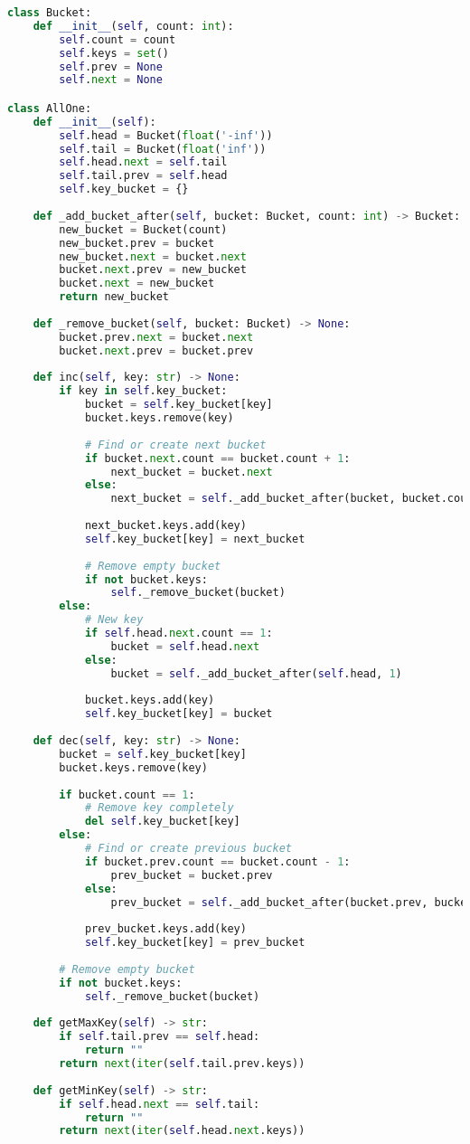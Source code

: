 \documentclass[10pt, a4paper]{article}
\begin{document}
\begin{lstlisting}[language=Python]
class Bucket:
    def __init__(self, count: int):
        self.count = count
        self.keys = set()
        self.prev = None
        self.next = None

class AllOne:
    def __init__(self):
        self.head = Bucket(float('-inf'))
        self.tail = Bucket(float('inf'))
        self.head.next = self.tail
        self.tail.prev = self.head
        self.key_bucket = {}
    
    def _add_bucket_after(self, bucket: Bucket, count: int) -> Bucket:
        new_bucket = Bucket(count)
        new_bucket.prev = bucket
        new_bucket.next = bucket.next
        bucket.next.prev = new_bucket
        bucket.next = new_bucket
        return new_bucket
    
    def _remove_bucket(self, bucket: Bucket) -> None:
        bucket.prev.next = bucket.next
        bucket.next.prev = bucket.prev
    
    def inc(self, key: str) -> None:
        if key in self.key_bucket:
            bucket = self.key_bucket[key]
            bucket.keys.remove(key)
            
            # Find or create next bucket
            if bucket.next.count == bucket.count + 1:
                next_bucket = bucket.next
            else:
                next_bucket = self._add_bucket_after(bucket, bucket.count + 1)
            
            next_bucket.keys.add(key)
            self.key_bucket[key] = next_bucket
            
            # Remove empty bucket
            if not bucket.keys:
                self._remove_bucket(bucket)
        else:
            # New key
            if self.head.next.count == 1:
                bucket = self.head.next
            else:
                bucket = self._add_bucket_after(self.head, 1)
            
            bucket.keys.add(key)
            self.key_bucket[key] = bucket
    
    def dec(self, key: str) -> None:
        bucket = self.key_bucket[key]
        bucket.keys.remove(key)
        
        if bucket.count == 1:
            # Remove key completely
            del self.key_bucket[key]
        else:
            # Find or create previous bucket
            if bucket.prev.count == bucket.count - 1:
                prev_bucket = bucket.prev
            else:
                prev_bucket = self._add_bucket_after(bucket.prev, bucket.count - 1)
            
            prev_bucket.keys.add(key)
            self.key_bucket[key] = prev_bucket
        
        # Remove empty bucket
        if not bucket.keys:
            self._remove_bucket(bucket)
    
    def getMaxKey(self) -> str:
        if self.tail.prev == self.head:
            return ""
        return next(iter(self.tail.prev.keys))
    
    def getMinKey(self) -> str:
        if self.head.next == self.tail:
            return ""
        return next(iter(self.head.next.keys))
\end{lstlisting}
\end{document}
